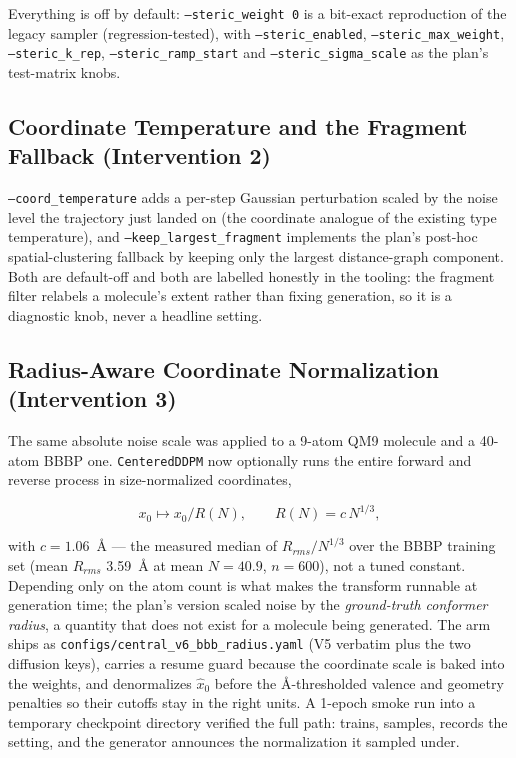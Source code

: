 \documentclass[12pt, a4paper]{article}
\begin{document}
Everything is off by default: \texttt{--steric\_weight 0} is a bit-exact
reproduction of the legacy sampler (regression-tested), with
\texttt{--steric\_enabled}, \texttt{--steric\_max\_weight},
\texttt{--steric\_k\_rep}, \texttt{--steric\_ramp\_start} and
\texttt{--steric\_sigma\_scale} as the plan's test-matrix knobs.

\subsection{Coordinate Temperature and the Fragment Fallback (Intervention 2)}

\texttt{--coord\_temperature} adds a per-step Gaussian perturbation scaled by
the noise level the trajectory just landed on (the coordinate analogue of the
existing type temperature), and \texttt{--keep\_largest\_fragment} implements
the plan's post-hoc spatial-clustering fallback by keeping only the largest
distance-graph component. Both are default-off and both are labelled honestly
in the tooling: the fragment filter relabels a molecule's extent rather than
fixing generation, so it is a diagnostic knob, never a headline setting.

\subsection{Radius-Aware Coordinate Normalization (Intervention 3)}

The same absolute noise scale was applied to a 9-atom QM9 molecule and a
40-atom BBBP one. \texttt{CenteredDDPM} now optionally runs the entire
forward and reverse process in size-normalized coordinates,

\begin{equation}
    x_0 \mapsto x_0 / R(N), \qquad R(N) = c\, N^{1/3},
\end{equation}

with $c = 1.06$~\AA{} --- the measured median of
$R_{rms} / N^{1/3}$ over the BBBP training set (mean $R_{rms}$ 3.59~\AA{} at
mean $N = 40.9$, $n = 600$), not a tuned constant. Depending only on the atom
count is what makes the transform runnable at generation time; the plan's
version scaled noise by the \emph{ground-truth conformer radius}, a quantity
that does not exist for a molecule being generated. The arm ships as
\texttt{configs/central\_v6\_bbb\_radius.yaml} (V5 verbatim plus the two
diffusion keys), carries a resume guard because the coordinate scale is baked
into the weights, and denormalizes $\hat{x}_0$ before the \AA{}-thresholded
valence and geometry penalties so their cutoffs stay in the right units. A
1-epoch smoke run into a temporary checkpoint directory verified the full
path: trains, samples, records the setting, and the generator announces the
normalization it sampled under.
\end{document}
